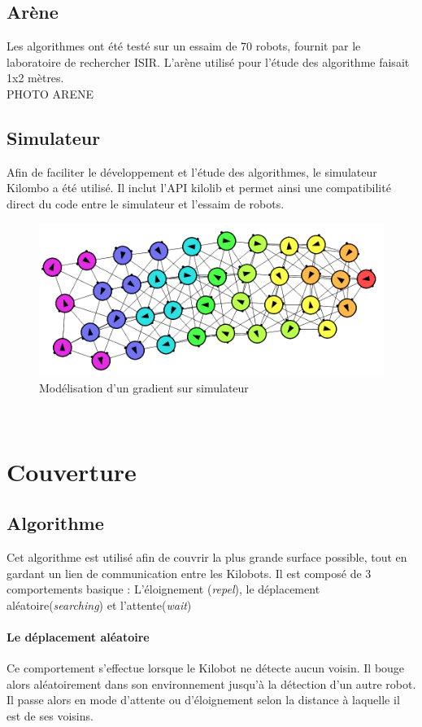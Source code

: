 \documentclass[a4paper]{article}
\begin{document}
\subsection{Arène}
Les algorithmes ont été testé sur un essaim de 70 robots, fournit par le laboratoire de rechercher ISIR. L'arène utilisé pour l'étude des algorithme faisait 1x2 mètres.\\
PHOTO ARENE
\subsection{Simulateur}
Afin de faciliter le développement et l'étude des algorithmes, le simulateur Kilombo a été utilisé. Il inclut l'API kilolib et permet ainsi une compatibilité direct du code entre le simulateur et l'essaim de robots.
\begin{figure}[h]
	\begin{center}
		\centering
		\includegraphics[width=0.8\linewidth]{../../script_results/gradient2-sim.png}
		\caption{Modélisation  d'un gradient sur simulateur}
	\end{center}
\end{figure} \\
\newpage
\section{Couverture}
\subsection{Algorithme}
Cet algorithme est utilisé afin de couvrir la plus grande surface possible, tout en gardant un lien de communication entre les Kilobots.
Il est composé de 3 comportements basique : L'éloignement (\textit{repel}), le déplacement aléatoire(\textit{searching}) et l'attente(\textit{wait})
\paragraph{Le déplacement aléatoire} Ce comportement s'effectue lorsque le Kilobot ne détecte aucun voisin. Il bouge alors aléatoirement dans son environnement jusqu'à la détection d'un autre robot. Il passe alors en mode d'attente ou d'éloignement selon la distance à laquelle il est de ses voisins.
\end{document}

